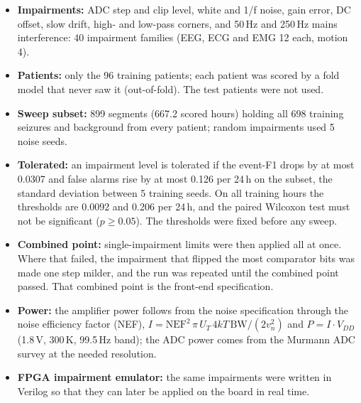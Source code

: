 \begin{itemize}
\item \textbf{Impairments:} ADC step and clip level, white and 1/f noise, gain error, DC offset, slow drift, high- and
  low-pass corners, and 50\,Hz and 250\,Hz mains interference: 40 impairment families (EEG, ECG and EMG 12 each, motion 4).
\item \textbf{Patients:} only the 96 training patients; each patient was scored by a fold model that never saw it
  (out-of-fold). The test patients were not used.
\item \textbf{Sweep subset:} 899 segments (667.2 scored hours) holding all 698 training seizures and background from
  every patient; random impairments used 5 noise seeds.
\item \textbf{Tolerated:} an impairment level is tolerated if the event-F1 drops by at most 0.0307 and false alarms rise
  by at most 0.126 per 24\,h on the subset, the standard deviation between 5 training seeds. On all training hours the
  thresholds are 0.0092 and 0.206 per 24\,h, and the paired Wilcoxon test must not be significant ($p \ge 0.05$). The
  thresholds were fixed before any sweep.
\item \textbf{Combined point:} single-impairment limits were then applied all at once. Where that failed, the impairment
  that flipped the most comparator bits was made one step milder, and the run was repeated until the combined point
  passed. That combined point is the front-end specification.
\item \textbf{Power:} the amplifier power follows from the noise specification through the noise efficiency factor (NEF),
  $I = \mathrm{NEF}^2\,\pi\,U_T\,4kT\,\mathrm{BW}/(2v_n^2)$ and $P = I \cdot V_{DD}$ (1.8\,V, 300\,K, 99.5\,Hz band); the
  ADC power comes from the Murmann ADC survey at the needed resolution.
\item \textbf{FPGA impairment emulator:} the same impairments were written in Verilog so that they can later be
  applied on the board in real time.
\end{itemize}
